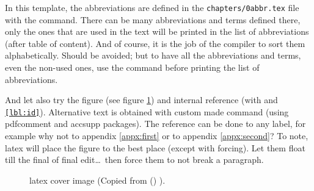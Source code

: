 In this template, the abbreviations are defined in the \texttt{chapters/0abbr.tex} file with the \texttt{} command. There can be many abbreviations and terms defined there, only the ones that are used in the text will be printed in the list of abbreviations (after table of content). And of course, it is the job of the compiler to sort them alphabetically. Should be avoided; but to have all the abbreviations and terms, even the non-used ones, use the \texttt{\glsaddall} command before printing the list of abbreviations.


And let also try the figure (see figure \ref{fig:latex-cover}) and internal reference (with \texttt{\label{lbl:id}} and \texttt{\ref{lbl:id}}). Alternative text is obtained with custom made \texttt{} command (using pdfcomment and accsupp packages). The reference can be done to any label, for example why not to appendix \ref{appx:first} or to appendix \ref{appx:second}? To note, \gls{latex} will place the figure to the best place (except with forcing). Let them float till the final of final edit\ldots ~then force them to not break a paragraph.%

\begin{figure}[ht]
  \centering
  \caption{\gls{latex} cover image (Copied from \citeauthor{wikibooks:latex} () \cite{wikibooks:latex}).}
  \label{fig:latex-cover}
\end{figure}

